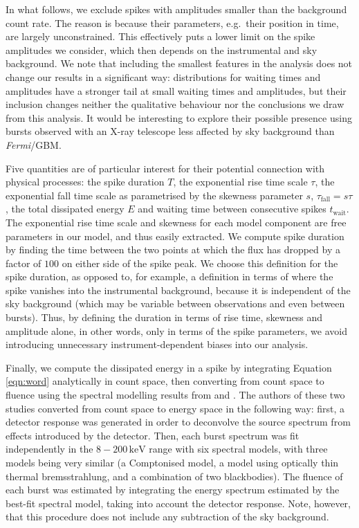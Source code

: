 \documentclass[12pt]{emulateapj}
\newcommand{\project}[1]{\textsl{#1}}
\newcommand{\fermi}{\project{Fermi}}
\begin{document}
In what follows, we exclude spikes with amplitudes smaller than the background count rate. The reason is because
 their parameters, e.g.\ their position in time, are largely unconstrained.
This effectively puts a lower limit on the spike amplitudes we consider, which then depends on the instrumental and sky background. We note
that including the smallest features in the analysis does not change our results in a significant way: distributions for 
waiting times and amplitudes have a stronger tail at small waiting times and amplitudes, but their inclusion changes neither
the qualitative behaviour nor the conclusions we draw from this analysis. It would be interesting to explore their possible presence
using bursts observed with an X-ray telescope less affected by sky background than \fermi/GBM.

Five quantities are of particular interest for their potential connection with physical processes: the spike duration $T$, the exponential rise time scale $\tau$, the exponential fall
time scale as parametrised by the skewness parameter $s$, $\tau_{\mathrm{fall}} = s\tau$, the total dissipated energy $E$ and waiting time between consecutive spikes $t_\mathrm{wait}$. The exponential rise time scale and skewness for each model component are free parameters
in our model, and thus easily extracted. We compute spike duration by finding the time between the two points at which the flux has dropped by a
 factor of $100$ on either side of the spike peak. We choose this definition for the spike duration, as opposed to, for example, a definition in terms of where the spike vanishes
 into the instrumental background, because it is independent of the sky background (which may be variable between observations and even between bursts). Thus, by defining the 
 duration in terms of rise time, skewness and amplitude alone, in other words, only in terms of the spike parameters, we avoid introducing unnecessary instrument-dependent
 biases into our analysis.


 Finally, we compute the dissipated energy in a spike by integrating Equation \ref{eqn:word} analytically in count space,
 then converting from count space to fluence using the spectral modelling results from \citet{vanderhorst2012} and \citet{vonkienlin2012}. The authors of these two studies converted from 
 count space to energy space in the following way: first, a detector response was generated in order to deconvolve the source spectrum from effects introduced by the detector. Then, each burst spectrum
 was fit independently in the $8-200\,\mathrm{keV}$ range with six spectral models, with three models being very similar (a Comptonised model, a model using optically thin thermal bremsstrahlung, and a combination of two blackbodies). The fluence of each burst was estimated by integrating the energy spectrum estimated by the best-fit spectral model, taking into account the detector response. Note, however, that this procedure does not include any subtraction of the sky background.
 
\end{document}
